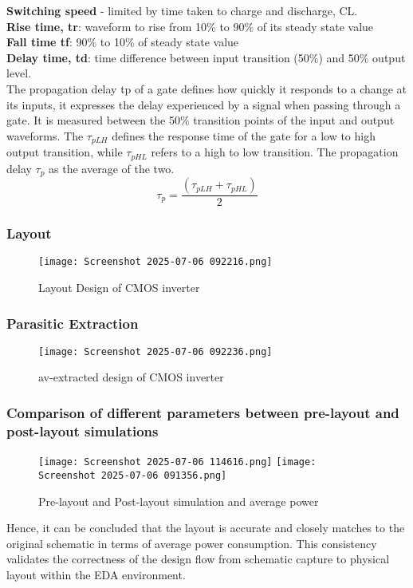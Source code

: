 \documentclass[12pt]{article}
\begin{document}
\textbf{Switching speed} - limited by time taken to charge and discharge, CL. \\
\textbf{Rise time, tr}: waveform to rise from 10\% to 90\% of its steady state value\\
\textbf{Fall time tf}: 90\% to 10\% of steady state value\\
\textbf{Delay time, td}: time difference between input transition (50\%) and 50\% output level.\\
The  propagation  delay  tp of  a  gate  defines  how  quickly  it  responds  to  a  change  at  its  inputs, it expresses the delay experienced by a signal when passing through a gate. It is measured  between  the  50\%  transition  points  of  the  input  and  output  waveforms. The $\tau_{pLH}$ defines the response time of the gate for a low to high output transition, while $\tau_{pHL}$  refers to a high to low transition. The propagation delay $\tau_{p}$ as the average of the two.
\[
\tau_p = \frac{(\tau_{pLH} + \tau_{pHL})}{2}
\]




\subsubsection{\textbf{Layout}}
\begin{figure}[H]
    \centering
    \texttt{[image: Screenshot 2025-07-06 092216.png]}
    \caption{Layout Design of CMOS inverter}
    \label{fig:enter-label}
\end{figure}

\subsubsection{\textbf{Parasitic Extraction}}
\begin{figure}[H]
        \centering
        \texttt{[image: Screenshot 2025-07-06 092236.png]}
        \caption{av-extracted design of CMOS inverter}
        \label{fig:enter-label}
    \end{figure}


   \subsubsection{\textbf{Comparison of different parameters between pre-layout and post-layout simulations}}

\begin{figure}[H]
    \centering
    \texttt{[image: Screenshot 2025-07-06 114616.png]}
    \texttt{[image: Screenshot 2025-07-06 091356.png]}
    \caption{Pre-layout and Post-layout simulation and average power}
    \label{fig:pre_post_sim_power}
\end{figure}
 Hence, it can be concluded that the layout is accurate and closely matches to the original schematic in terms of average power consumption. This consistency validates the correctness of the design flow from schematic capture to physical layout within the EDA environment.
\end{document}
